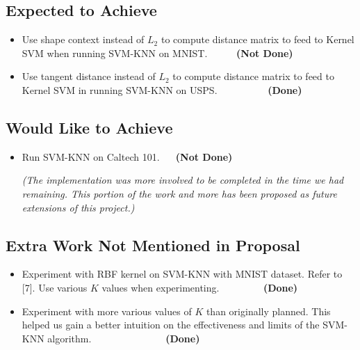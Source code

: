 \documentclass[11pt,letterpaper]{article}
\begin{document}
\subsection{Expected to Achieve}
\begin{itemize}
\item Use shape context instead of $L_2$ to compute distance matrix to feed to Kernel SVM when running SVM-KNN on MNIST. $\>\>\>\>\>\>\>\>\>\>\>\>$\textbf{(Not Done)}

\item Use tangent distance instead of $L_2$ to compute distance matrix to feed to Kernel SVM in running SVM-KNN on USPS. $\>\>\>\>\>\>\>\>\>\>\>\>\>\>\>\>\>\>\>\>\>\>$\textbf{(Done)}
\end{itemize}

\subsection{Would Like to Achieve}
\begin{itemize}
\item Run SVM-KNN on Caltech 101. $\>\>\>\>\>\>$\textbf{(Not Done)}

\textit{(The implementation was more involved to be completed in the time we had remaining. This portion of the work and more has been proposed as future extensions of this project.)}
\end{itemize}

\subsection{Extra Work Not Mentioned in Proposal}

\begin{itemize}
\item Experiment with RBF kernel on SVM-KNN with MNIST dataset. Refer to [7]. Use various $K$ values when experimenting. $\>\>\>\>\>\>\>\>\>\>\>\>\>\>\>\>\>\>\>$\textbf{(Done)}

\item Experiment with more various values of $K$ than originally planned. This helped us gain a better intuition on the effectiveness and limits of the SVM-KNN algorithm. $\>\>\>\>\>\>\>\>\>\>\>\>\>\>\>\>\>\>\>\>\>\>\>\>\>\>\>\>\>\>\>\>\>$\textbf{(Done)}

\end{itemize}

\newpage
\end{document}
